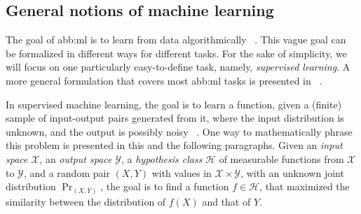 \subsection{General notions of machine learning}%
\label{sub:general_notions_of_ml}

The goal of \gls{abb:ml} is to learn from data algorithmically%
~\cite{%
  kulkarniElementaryIntroductionStatistical2011,%
  vapnikStatisticalLearningTheory1998,%
  abu-mostafaLearningDataShort2012%
}.
This vague goal can be formalized in different ways for different tasks.
For the sake of simplicity, we will focus on one particularly easy-to-define task,
namely, \emph{supervised learning}.
A more general formulation that covers most \gls{abb:ml} tasks is presented in%
~\cite{grohsMathematicalAspectsDeep2023}.

In supervised machine learning, the goal is to learn a function,
given a (finite) sample of input-output pairs generated from it,
where the input distribution is unknown, and the output is possibly noisy%
~\cite{raschkaMachineLearningPyTorch2022}.
One way to mathematically phrase this problem
is presented in this and the following paragraphs.
Given an \emph{input space} \(\mathcal{X}\),
an \emph{output space} \(\mathcal{Y}\),
a \emph{hypothesis class} \(\mathcal{H}\) of measurable functions
from \(\mathcal{X}\) to \(\mathcal{Y}\),
and a random pair \((X, Y)\) with values in \(\mathcal{X}\times\mathcal{Y}\),
with an unknown joint distribution \(\Pr_{(X, Y)}\),
the goal is to find a function \(f \in \mathcal{H}\),
that maximized the similarity between the distribution of \(f(X)\)
and that of \(Y\).

